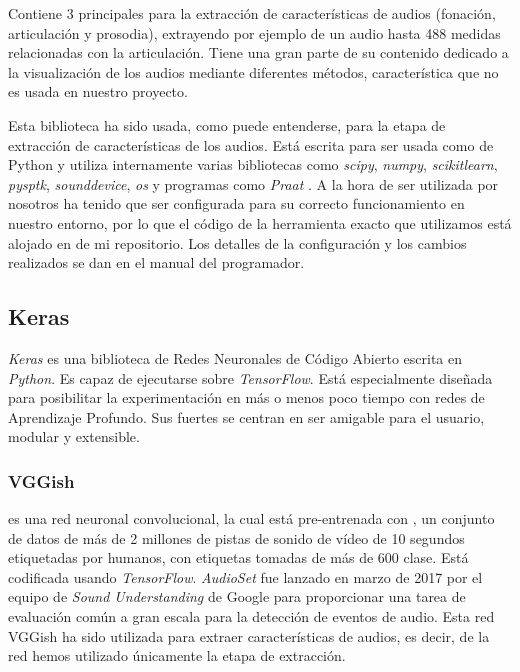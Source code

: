 Contiene 3  principales para la extracción de características de audios (fonación, articulación y prosodia), extrayendo por ejemplo de un audio hasta 488 medidas relacionadas con la articulación. Tiene una gran parte de su contenido dedicado a la visualización de los audios mediante diferentes métodos, característica que no es usada en nuestro proyecto. 

Esta biblioteca ha sido usada, como puede entenderse, para la etapa de extracción de características de los audios. Está escrita para ser usada como  de Python y utiliza internamente varias bibliotecas como \textit{scipy}, \textit{numpy}, \textit{scikitlearn}, \textit{pysptk}, \textit{sounddevice}, \textit{os} y programas como \textit{Praat} \cite{praat}. A la hora de ser utilizada por nosotros ha tenido que ser configurada para su correcto funcionamiento en nuestro entorno, por lo que el código de la herramienta exacto que utilizamos está alojado en  de mi repositorio. Los detalles de la configuración y los cambios realizados se dan en el manual del programador.


\subsection{Keras}
\textit{Keras} \cite{wiki:keras} es una biblioteca de Redes Neuronales de Código Abierto escrita en \textit{Python}. Es capaz de ejecutarse sobre \textit{TensorFlow}. Está especialmente diseñada para posibilitar la experimentación en más o menos poco tiempo con redes de Aprendizaje Profundo. Sus fuertes se centran en ser amigable para el usuario, modular y extensible.

\subsubsection{VGGish} \label{subsec:vggish}
 \cite{vggish} es una red neuronal convolucional, la cual está pre-entrenada con  \cite{audioset}, un conjunto de datos de más de 2 millones de pistas de sonido de vídeo de 10 segundos etiquetadas por humanos, con etiquetas tomadas de más de 600 clase. Está codificada usando \textit{TensorFlow}. \textit{AudioSet} fue lanzado en marzo de 2017 por el equipo de \textit{Sound Understanding} de Google para proporcionar una tarea de evaluación común a gran escala para la detección de eventos de audio. Esta red VGGish ha sido utilizada para extraer características de audios, es decir, de la red hemos utilizado únicamente la etapa de extracción.

